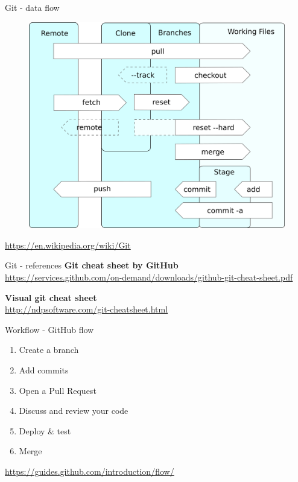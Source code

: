 \documentclass[aspectratio=169]{beamer}
\begin{document}
	\begin{frame}{Git - data flow}
		\begin{figure}
			\centering
			\includegraphics[width=0.5\linewidth]{images/Git_operations.png}
		\end{figure}
		\tiny \hyperlink{https://en.wikipedia.org/wiki/Git}{https://en.wikipedia.org/wiki/Git}
	\end{frame}
	\begin{frame}{Git - references}
		\Large
		\textbf{Git cheat sheet by GitHub}\\  \hyperlink{https://services.github.com/on-demand/downloads/github-git-cheat-sheet.pdf}{https://services.github.com/on-demand/downloads/github-git-cheat-sheet.pdf}
		
		\bigskip
		
		\textbf{Visual git cheat sheet}\\ \hyperlink{http://ndpsoftware.com/git-cheatsheet.html}{http://ndpsoftware.com/git-cheatsheet.html}
	\end{frame}
	
	\begin{frame}{Workflow - GitHub flow}
		\begin{enumerate}
			\item Create a branch
			\item Add commits
			\item Open a Pull Request
			\item Discuss and review your code
			\item Deploy \& test
			\item Merge
		\end{enumerate}
		 \hyperlink{https://guides.github.com/introduction/flow/}{https://guides.github.com/introduction/flow/}
	\end{frame}
	
\end{document}
